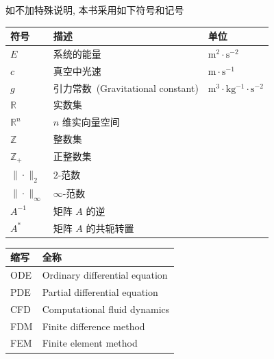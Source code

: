 


\begin{denotation}

如不加特殊说明, 本书采用如下符号和记号

\vspace{1em}
\renewcommand{\arraystretch}{1.2}  %

\noindent\begin{tabularx}{\textwidth}{@{}p{}Xp{}@{}}
    \textbf{符号} & \textbf{描述} & \textbf{单位} \\
    \midrule
    $E$ & 系统的能量 & $\mathrm{m^{2} \cdot s^{-2}}$ \\
    $c$ & 真空中光速 & $\mathrm{m\cdot s^{-1}}$ \\
    $g$ & 引力常数~(Gravitational constant) & $\mathrm{m^{3}\cdot kg^{-1} \cdot s^{-2}}$ \\
    $\mathbb{R}$ & 实数集 & \\
    $\mathbb{R}^{n}$ & $n$ 维实向量空间 & \\
    $\mathbb{Z}$ & 整数集 & \\
    $\mathbb{Z}_{+}$ & 正整数集 & \\
    $\|\cdot\|_2$ & $2$-范数 & \\
    $\|\cdot\|_{\infty}$ & $\infty$-范数 & \\
    $A^{-1}$ & 矩阵 $A$ 的逆 & \\
    $A^{*}$ & 矩阵 $A$ 的共轭转置 & \\
\end{tabularx}

\vspace{2em}

\noindent\begin{tabularx}{\textwidth}{@{}p{}X@{}}
    \textbf{缩写} & \textbf{全称} \\
    \midrule
    ODE & Ordinary differential equation \\
    PDE & Partial differential equation \\
    CFD & Computational fluid dynamics \\
    FDM & Finite difference method \\
    FEM & Finite element method \\
\end{tabularx}

\end{denotation}
